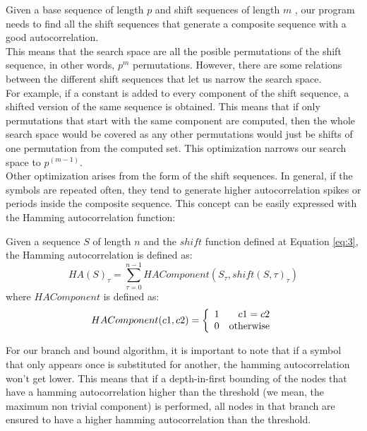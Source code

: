  Given a base sequence of length $p$ and  shift sequences of length $m$ ,
  our program needs to find all the shift sequences that generate a composite
  sequence with a good autocorrelation.\\

  This means that the search space are all the posible permutations of the
  shift sequence, in other words, $p^m$ permutations. However, there are some
  relations between the different shift sequences that let us narrow the
  search space.\\

  For example, if a constant is added to every component of the shift sequence,
  a shifted version of the same sequence is obtained. This means that if only
   permutations that start with the same component are computed,
  then the whole search space would be covered as any other permutations would just
  be shifts of one permutation from the computed set. This optimization narrows
  our search space to $p^{(m-1)}$.\\

  Other optimization arises from the form of the shift sequences. In general,
  if the symbols are repeated often, they tend to generate higher
  autocorrelation spikes or periods inside the composite sequence. This
  concept can be easily expressed with the Hamming autocorrelation function:\\

  \begin{definition}
    Given a sequence $S$ of length $n$ and the  $shift$ function  defined at
    Equation \eqref{eq:3}, the Hamming autocorrelation is defined as:
      \begin{equation} \label{hamming:eq:1}
        HA(S)_{\tau} = \sum_{\tau = 0}^{n-1} HAComponent(S_{\tau}, shift(S, \tau)_{\tau})
      \end{equation}
    where $HAComponent$ is defined as:
      \begin{equation}
        HAComponent(c1, c2) = \left\{\begin{array}{lr}
            1  &  c1 = c2\\
            0  & \textnormal{otherwise} \\
        \end{array}\right.
      \end{equation}
  \end{definition}

  For our branch and bound algorithm, it is important to note that if a symbol
  that only appears once is substituted for another, the hamming
  autocorrelation won't get lower. This means that if a depth-in-first
  bounding of the nodes that have a hamming autocorrelation higher than the
  threshold (we mean, the maximum non trivial component) is performed,
  all nodes in that branch are ensured to have a higher hamming autocorrelation
  than the threshold.\\

